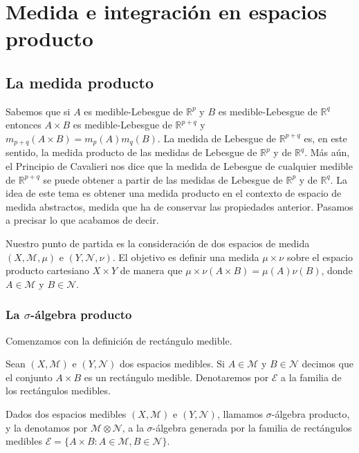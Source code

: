 \chapter{Medida e integración en espacios producto}

\section{La medida producto}

Sabemos que si $A$ es medible-Lebesgue de $\mathbb{R}^p$ y $B$ es medible-Lebesgue de $\mathbb{R}^q$ entonces $A \times B$ es medible-Lebesgue de $\mathbb{R}^{p+q}$ y $m_{p+q}(A \times B) = m_p(A)m_q(B)$. La medida de Lebesgue de $\mathbb{R}^{p+q}$ es, en este sentido, la medida producto de las medidas de Lebesgue de $\mathbb{R}^p$ y de $\mathbb{R}^q$. Más aún, el Principio de Cavalieri nos dice que la medida de Lebesgue de cualquier medible de $\mathbb{R}^{p+q}$ se puede obtener a partir de las medidas de Lebesgue de $\mathbb{R}^p$ y de $\mathbb{R}^{q}$. La idea de este tema es obtener una medida producto en el contexto de espacio de medida abstractos, medida que ha de conservar las propiedades anterior. Pasamos a precisar lo que acabamos de decir.

Nuestro punto de partida es la consideración de dos espacios de medida $(X, \mathcal{M}, \mu)$ e $(Y, \mathcal{N}, \nu)$. El objetivo es definir una medida $\mu \times \nu$ sobre el espacio producto cartesiano $X \times Y$ de manera que $\mu \times \nu(A \times B) = \mu(A)\nu(B)$, donde $A \in \mathcal{M}$ y $B \in \mathcal{N}$.

\subsection{La $\sigma$-álgebra producto}
Comenzamos con la definición de rectángulo medible.

\begin{defi}
    Sean $(X, \mathcal{M})$ e $(Y, \mathcal{N})$ dos espacios medibles. Si $A \in \mathcal{M}$ y $B \in \mathcal{N}$ decimos que el conjunto $A \times B$ es un rectángulo medible. Denotaremos por $\mathcal{E}$ a la familia de los rectángulos medibles.
\end{defi}

\begin{defi}
    Dados dos espacios medibles $(X, \mathcal{M})$ e $(Y, \mathcal{N})$, llamamos $\sigma$-álgebra producto, y la denotamos por $\mathcal{M} \otimes \mathcal{N}$, a la $\sigma$-álgebra generada por la familia de rectángulos medibles $\mathcal{E} = \{ A \times B : A \in \mathcal{M}, B \in \mathcal{N}\}$.
\end{defi}

